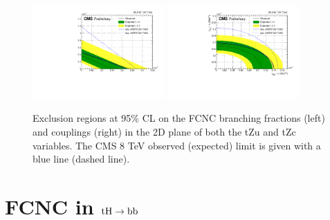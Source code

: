 \documentclass{PoS}
\begin{document}
\begin{figure}[htb]
\centering
\includegraphics[width=0.45\textwidth]{figures/CMS-PAS-TOP-17-017_Figure_007-a}
\includegraphics[width=0.45\textwidth]{figures/CMS-PAS-TOP-17-017_Figure_007-b}
\caption{
  Exclusion regions at 95\% CL on the FCNC branching fractions (left) and
  couplings (right) in the 2D plane of both the tZu and tZc variables. The CMS
  8 TeV observed (expected) limit is given with a blue line (dashed line).
}
\label{fig:TOP-17-017_Figure_007}
\end{figure}


\section{FCNC in ${\rm tH \to bb}$}
\end{document}
